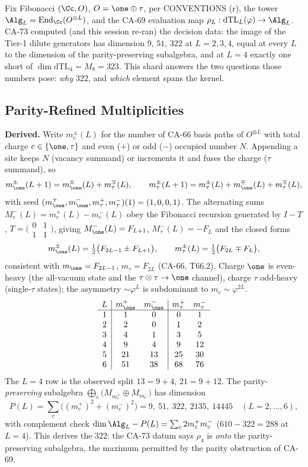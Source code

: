 Fix Fibonacci \((\Cc,O)\), \(O=\one\oplus\tau\), per CONVENTIONS (r), the
tower \(\Alg_L=\operatorname{End}_{\Cc}(O^{\otimes L})\), and the CA-69
evaluation map \(\rho_L:\mathrm{dTL}_L(\varphi)\to\Alg_L\).  CA-73 computed
(and this session re-ran) the decision data: the image of the Tier-1 dilute
generators has dimension \(9,\,51,\,322\) at \(L=2,3,4\), equal at every
\(L\) to the dimension of the parity-preserving subalgebra, and at \(L=4\)
exactly one short of \(\dim\mathrm{dTL}_4=M_8=323\).  This shard answers the
two questions those numbers pose: \emph{why} \(322\), and \emph{which}
element spans the kernel.

\subsection{Parity-Refined Multiplicities}

\textbf{Derived.}  Write \(m_c^{\pm}(L)\) for the number of CA-66 basis
paths of \(O^{\otimes L}\) with total charge \(c\in\{\one,\tau\}\) and even
(\(+\)) or odd (\(-\)) occupied number \(N\).  Appending a site keeps \(N\)
(vacancy summand) or increments it and fuses the charge (\(\tau\) summand),
so
\[
  m_\one^{\pm}(L+1)=m_\one^{\pm}(L)+m_\tau^{\mp}(L),\qquad
  m_\tau^{\pm}(L+1)=m_\tau^{\pm}(L)+m_\one^{\mp}(L)+m_\tau^{\mp}(L),
\]
with seed \((m_\one^+,m_\one^-,m_\tau^+,m_\tau^-)(1)=(1,0,0,1)\).  The
alternating sums \(M_c^{-}(L)=m_c^+(L)-m_c^-(L)\) obey the Fibonacci
recursion generated by \(I-T\), \(T=\bigl(\begin{smallmatrix}0&1\\1&1
\end{smallmatrix}\bigr)\), giving \(M_\one^-(L)=F_{L+1}\),
\(M_\tau^-(L)=-F_L\) and the closed forms
\[
  m_\one^{\pm}(L)=\tfrac12\bigl(F_{2L-1}\pm F_{L+1}\bigr),
  \qquad
  m_\tau^{\pm}(L)=\tfrac12\bigl(F_{2L}\mp F_{L}\bigr),
\]
consistent with \(m_\one=F_{2L-1}\), \(m_\tau=F_{2L}\) (CA-66, T66.2).
Charge \(\one\) is even-heavy (the all-vacuum state and the
\(\tau\otimes\tau\to\one\) channel), charge \(\tau\) odd-heavy (single-\(\tau\)
states); the asymmetry \(\sim\varphi^L\) is subdominant to
\(m_c\sim\varphi^{2L}\).
\[
\begin{array}{c|cc|cc}
L & m_\one^+ & m_\one^- & m_\tau^+ & m_\tau^- \\\hline
1 & 1 & 0 & 0 & 1\\
2 & 2 & 0 & 1 & 2\\
3 & 4 & 1 & 3 & 5\\
4 & 9 & 4 & 9 & 12\\
5 & 21 & 13 & 25 & 30\\
6 & 51 & 38 & 68 & 76
\end{array}
\]
The \(L=4\) row is the observed split \(13=9+4\), \(21=9+12\).  The
parity-\emph{preserving} subalgebra
\(\bigoplus_c\bigl(M_{m_c^+}\oplus M_{m_c^-}\bigr)\) has dimension
\[
  P(L)=\sum_c\bigl((m_c^+)^2+(m_c^-)^2\bigr)
  =9,\ 51,\ 322,\ 2135,\ 14445\quad(L=2,\dots,6),
\]
with complement check \(\dim\Alg_L-P(L)=\sum_c2m_c^+m_c^-\)
(\(610-322=288\) at \(L=4\)).  This derives the \(322\): the CA-73 datum
says \(\rho_4\) is \emph{onto} the parity-preserving subalgebra, the
maximum permitted by the parity obstruction of CA-69.

